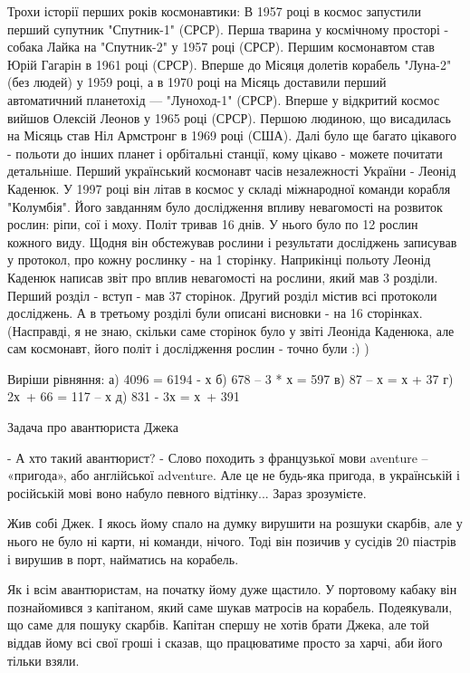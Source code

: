 Трохи історії перших років космонавтики:
В 1957 році в космос запустили перший супутник "Спутник-1" (СРСР).
Перша тварина у космічному просторі - собака Лайка на "Спутник-2"
у 1957 році (СРСР).
Першим космонавтом став Юрій Гагарін в 1961 році (СРСР).
Вперше до Місяця долетів корабель "Луна-2" (без людей) у 1959 році,
а в 1970 році на Місяць доставили перший автоматичний планетохід —
"Луноход-1" (СРСР).
Вперше у відкритий космос вийшов Олексій Леонов у 1965 році (СРСР).
Першою людиною, що висадилась на Місяць став Ніл Армстронг в 1969 році (США).
Далі було ще багато цікавого - польоти до інших планет і орбітальні станції,
кому цікаво - можете почитати детальніше.
Перший український космонавт часів незалежності України - Леонід Каденюк.
У 1997 році він літав в космос у складі міжнародної команди корабля "Колумбія".
Його завданням було дослідження впливу невагомості на розвиток рослин:
ріпи, сої і моху. Політ тривав 16 днів. У нього було по 12 рослин кожного виду.
Щодня він обстежував рослини і результати досліджень записував у протокол,
про кожну рослинку - на 1 сторінку. Наприкінці польоту Леонід Каденюк
написав звіт про вплив невагомості на рослини, який мав 3 розділи.
Перший розділ - вступ - мав 37 сторінок. Другий розділ містив всі
протоколи досліджень. А в третьому розділі були описані висновки -
на 16 сторінках.
(Насправді, я не знаю, скільки саме сторінок було у звіті Леоніда Каденюка,
але сам космонавт, його політ і дослідження рослин - точно були :) )


\problem
Виріши рівняння:
а) 4096 = 6194 - х
б) 678 – 3 * х = 597
в) 87 – х = х + 37
г) 2х + 66 = 117 – х
д) 831 - 3х = х + 391


\problem
Задача про авантюриста Джека

- А хто такий авантюрист?
- Слово походить з французької мови aventure – «пригода»,
або англійської adventure. Але це не будь-яка пригода,
в українській і російській мові воно набуло певного відтінку...
Зараз зрозумієте.

Жив собі Джек. І якось йому спало на думку вирушити на розшуки скарбів,
але у нього не було ні карти, ні команди, нічого. Тоді він позичив
у сусідів 20 піастрів і вирушив в порт, найматись на корабель.

Як і всім авантюристам, на початку йому дуже щастило.
У портовому кабаку він познайомився з капітаном, який саме шукав
матросів на корабель. Подеякували, що саме для пошуку скарбів.
Капітан спершу не хотів брати Джека, але той віддав йому всі свої
гроші і сказав, що працюватиме просто за харчі, аби його тільки взяли.

